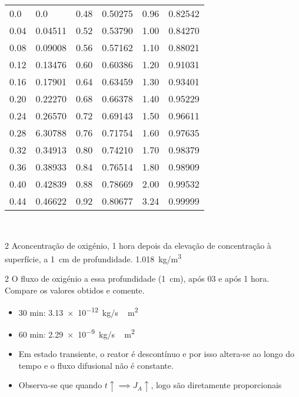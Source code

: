 \documentclass[\mainfilename]{subfiles}
\begin{document}
\begin{questionBox}
\begin{center}
\begin{tabular}{LL *{2}{ | LL}}
                   0.0  & 0.0     & 0.48 & 0.50275 & 0.96 & 0.82542
                \\ 0.04 & 0.04511 & 0.52 & 0.53790 & 1.00 & 0.84270
                \\ 0.08 & 0.09008 & 0.56 & 0.57162 & 1.10 & 0.88021
                \\ 0.12 & 0.13476 & 0.60 & 0.60386 & 1.20 & 0.91031
                \\ 0.16 & 0.17901 & 0.64 & 0.63459 & 1.30 & 0.93401
                \\ 0.20 & 0.22270 & 0.68 & 0.66378 & 1.40 & 0.95229
                \\ 0.24 & 0.26570 & 0.72 & 0.69143 & 1.50 & 0.96611
                \\ 0.28 & 6.30788 & 0.76 & 0.71754 & 1.60 & 0.97635
                \\ 0.32 & 0.34913 & 0.80 & 0.74210 & 1.70 & 0.98379
                \\ 0.36 & 0.38933 & 0.84 & 0.76514 & 1.80 & 0.98909
                \\ 0.40 & 0.42839 & 0.88 & 0.78669 & 2.00 & 0.99532
                \\ 0.44 & 0.46622 & 0.92 & 0.80677 & 3.24 & 0.99999
            
            \\\bottomrule
        \end{tabular}
        \\[1ex]
        \vspace{2ex}
    \end{center}
\end{questionBox}

\begin{questionBox}2{ %
    Aconcentração de oxigénio, 1 hora depois da elevação de concentração à superfície, a \qty*{1}{\cm} de profundidade.
} %
    \answer{}
    \qty{1.018}{\kg/\m^3}
\end{questionBox}

\begin{questionBox}2{ %
    O fluxo de oxigénio a essa profundidade (\qty*{1}{\cm}), após \qty*{03}{\min} e após 1 hora. Compare os valores obtidos e comente.
} %
    \answer{}
    \begin{itemize}
        \item 30 min: \qty{3.13e-12}{\kg/\s\,\m^2}
        \item 60 min: \qty{2.29e-9}{\kg/\s\,\m^2}
        \item Em estado transiente, o reator é descontínuo e por isso altera-se ao longo do tempo e o fluxo difusional não é constante.
        \item Observa-se que quando \(t\uparrow\implies J_A\uparrow\), logo são diretamente proporcionais
    \end{itemize}
\end{questionBox}
\end{document}
